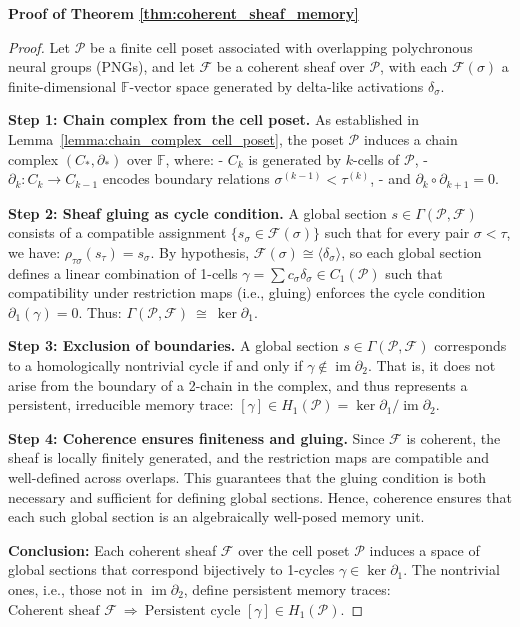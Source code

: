 \documentclass[lettersize,journal]{IEEEtran}
\begin{document}
\noindent\textbf{Proof of Theorem \ref{thm:coherent_sheaf_memory}}

\begin{proof}
Let \( \mathcal{P} \) be a finite cell poset associated with overlapping polychronous neural groups (PNGs), and let \( \mathcal{F} \) be a coherent sheaf over \( \mathcal{P} \), with each \( \mathcal{F}(\sigma) \) a finite-dimensional \( \mathbb{F} \)-vector space generated by delta-like activations \( \delta_\sigma \).

\textbf{Step 1: Chain complex from the cell poset.}  
As established in Lemma~\ref{lemma:chain_complex_cell_poset}, the poset \( \mathcal{P} \) induces a chain complex \( (C_*, \partial_*) \) over \( \mathbb{F} \), where:
- \( C_k \) is generated by \( k \)-cells of \( \mathcal{P} \),
- \( \partial_k: C_k \to C_{k-1} \) encodes boundary relations \( \sigma^{(k-1)} < \tau^{(k)} \),
- and \( \partial_k \circ \partial_{k+1} = 0 \).

\textbf{Step 2: Sheaf gluing as cycle condition.}  
A global section \( s \in \Gamma(\mathcal{P}, \mathcal{F}) \) consists of a compatible assignment \( \{ s_\sigma \in \mathcal{F}(\sigma) \} \) such that for every pair \( \sigma < \tau \), we have:
$\rho_{\tau\sigma}(s_\tau) = s_\sigma$.
By hypothesis, \( \mathcal{F}(\sigma) \cong \langle \delta_\sigma \rangle \), so each global section defines a linear combination of 1-cells \( \gamma = \sum c_\sigma \delta_\sigma \in C_1(\mathcal{P}) \) such that compatibility under restriction maps (i.e., gluing) enforces the cycle condition \( \partial_1(\gamma) = 0 \). Thus:
$\Gamma(\mathcal{P}, \mathcal{F}) \ \cong \ \ker \partial_1$.

\textbf{Step 3: Exclusion of boundaries.}  
A global section \( s \in \Gamma(\mathcal{P}, \mathcal{F}) \) corresponds to a homologically nontrivial cycle if and only if \( \gamma \notin \operatorname{im} \partial_2 \). That is, it does not arise from the boundary of a 2-chain in the complex, and thus represents a persistent, irreducible memory trace:
$[\gamma] \in H_1(\mathcal{P}) = \ker \partial_1 / \operatorname{im} \partial_2$.


\textbf{Step 4: Coherence ensures finiteness and gluing.}  
Since \( \mathcal{F} \) is coherent, the sheaf is locally finitely generated, and the restriction maps are compatible and well-defined across overlaps. This guarantees that the gluing condition is both necessary and sufficient for defining global sections. Hence, coherence ensures that each such global section is an algebraically well-posed memory unit.

\textbf{Conclusion:}  
Each coherent sheaf \( \mathcal{F} \) over the cell poset \( \mathcal{P} \) induces a space of global sections that correspond bijectively to 1-cycles \( \gamma \in \ker \partial_1 \). The nontrivial ones, i.e., those not in \( \operatorname{im} \partial_2 \), define persistent memory traces:
$\boxed{
\text{Coherent sheaf } \mathcal{F} \ \Longrightarrow \ \text{Persistent cycle } [\gamma] \in H_1(\mathcal{P})
}$.
\end{proof}
\end{document}
